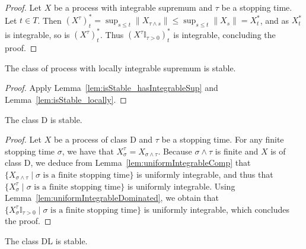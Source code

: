 \begin{proof}\leanok
Let $X$ be a process with integrable supremum and $\tau$ be a stopping time. Let $t \in T$. Then $(X^\tau)^*_t = \sup_{s \le t} \|X_{\tau \land s}\| \le \sup_{s \le t} \|X_s\| = X^*_t$, and as $X^*_t$ is integrable, so is $(X^\tau)^*_t$. Thus $(X^\tau \mathbb{I}_{\tau > 0})^*_t$ is integrable, concluding the proof.
\end{proof}

\begin{lemma}\label{lem:isStable_hasLocallyIntegrableSup}
  \leanok
The class of process with locally integrable supremum is stable.
\end{lemma}

\begin{proof}\leanok
Apply Lemma~\ref{lem:isStable_hasIntegrableSup} and Lemma~\ref{lem:isStable_locally}.
\end{proof}


\begin{lemma}\label{lem:isStable_classD}
  \leanok
The class D is stable.
\end{lemma}

\begin{proof}\leanok
Let $X$ be a process of class D and $\tau$ be a stopping time. For any finite stopping time $\sigma$, we have that $X_\sigma^\tau = X_{\sigma \land \tau}$. Because $\sigma \land \tau$ is finite and $X$ is of class D, we deduce from Lemma~\ref{lem:uniformIntegrableComp} that $\{X_{\sigma \land \tau} \mid \sigma \text{ is a finite stopping time}\}$ is uniformly integrable, and thus that $\{X^\tau_\sigma \mid \sigma \text{ is a finite stopping time}\}$ is uniformly integrable. Using Lemma~\ref{lem:uniformIntegrableDominated}, we obtain that $\{X^\tau_\sigma \mathbb{I}_{\tau > 0} \mid \sigma \text{ is a finite stopping time}\}$ is uniformly integrable, which concludes the proof.
\end{proof}


\begin{lemma}\label{lem:isStable_classDL}
  \leanok
The class DL is stable.
\end{lemma}

